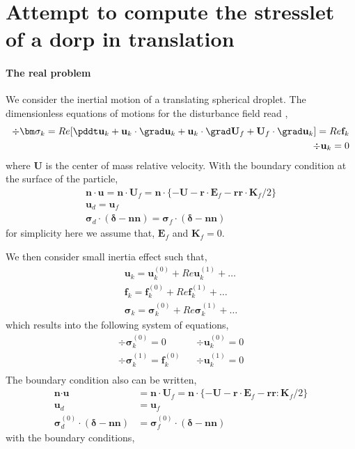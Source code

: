 \section{Attempt to compute the stresslet of a dorp in translation}

\paragraph*{The real problem}
We consider the inertial motion of a translating spherical droplet. 
The dimensionless equations of motions for the disturbance field read \citet{chap:daniel1}, 
\begin{align*}
    \div\bm\sigma_k
    = 
    Re [
    \pddt \textbf{u}_k
    + \textbf{u}_k\cdot \grad \textbf{u}_k
    + \textbf{u}_k\cdot \grad \textbf{U}_f
    + \textbf{U}_f\cdot \grad \textbf{u}_k]
    = Re \textbf{f}_k\\
    \div \textbf{u}_k = 0
\end{align*}
where $\textbf{U}$ is the center of mass relative velocity. 
With the boundary condition at the surface of the particle, 
\begin{align*}
    \textbf{n}\cdot \textbf{u} 
    = \textbf{n}\cdot \textbf{U}_f=\textbf{n}\cdot \{
        - \textbf{U}
        - \textbf{r}\cdot \textbf{E}_f
        - \textbf{rr}\cdot \textbf{K}_f/2
    \}\\
    \textbf{u}_d = \textbf{u}_f\\
    \bm\sigma_d\cdot (\bm\delta - \textbf{nn}) = \bm\sigma_f\cdot (\bm\delta - \textbf{nn})
\end{align*}
for simplicity here we assume that, $\textbf{E}_f$ and $\textbf{K}_f =0$. 

We then consider small inertia effect such that,
\begin{align*}
    \textbf{u}_k = \textbf{u}_k^{(0)} + Re \textbf{u}_k^{(1)} + \ldots\\
    \textbf{f}_k = \textbf{f}_k^{(0)} + Re \textbf{f}_k^{(1)} + \ldots\\
    \bm\sigma_k = \bm\sigma_k^{(0)} + Re \bm\sigma_k^{(1)} + \ldots
\end{align*}
which results into the following system of equations, 
\begin{align*}
    \div \bm\sigma^{(0)}_k = 0 
    && 
    \div \textbf{u}_k^{(0)}=0
    \\
    \div \bm\sigma^{(1)}_k = \textbf{f}^{(0)}_k 
    && \div \textbf{u}_k^{(1)} =0 
    \\
\end{align*}
The boundary condition also can be written, 
\begin{align}
    \textbf{n}\cdot \textbf{u} 
    &= \textbf{n}\cdot \textbf{U}_f=\textbf{n}\cdot \{
        - \textbf{U}
        - \textbf{r}\cdot \textbf{E}_f
        - \textbf{rr} : \textbf{K}_f/2
    \}\\
    \textbf{u}_d &= \textbf{u}_f\\
    \bm\sigma_d^{(0)}\cdot (\bm\delta - \textbf{nn}) &= \bm\sigma_f^{(0)}\cdot (\bm\delta - \textbf{nn})
\end{align}
with the boundary conditions, 

